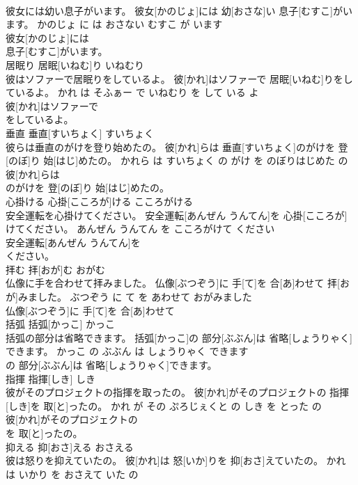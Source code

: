 \documentclass[8pt]{extreport}
\begin{document}
\begin{CJK}{UTF8}{min}
\\	彼女には幼い息子がいます。	彼女[かのじょ]には 幼[おさな]い 息子[むすこ]がいます。	かのじょ に は おさない むすこ が います	
\\	彼女[かのじょ]には
\\	息子[むすこ]がいます。			
\\	居眠り	居眠[いねむ]り	いねむり	
\\	彼はソファーで居眠りをしているよ。	彼[かれ]はソファーで 居眠[いねむ]りをしているよ。	かれ は そふぁー で いねむり を して いる よ	
\\	彼[かれ]はソファーで
\\	をしているよ。			
\\	垂直	垂直[すいちょく]	すいちょく	
\\	彼らは垂直のがけを登り始めたの。	彼[かれ]らは 垂直[すいちょく]のがけを 登[のぼ]り 始[はじ]めたの。	かれら は すいちょく の がけ を のぼりはじめた の	
\\	彼[かれ]らは
\\	のがけを 登[のぼ]り 始[はじ]めたの。			
\\	心掛ける	心掛[こころが]ける	こころがける	
\\	安全運転を心掛けてください。	安全運転[あんぜん うんてん]を 心掛[こころが]けてください。	あんぜん うんてん を こころがけて ください	
\\	安全運転[あんぜん うんてん]を
\\	ください。			
\\	拝む	拝[おが]む	おがむ	
\\	仏像に手を合わせて拝みました。	仏像[ぶつぞう]に 手[て]を 合[あ]わせて 拝[おが]みました。	ぶつぞう に て を あわせて おがみました	
\\	仏像[ぶつぞう]に 手[て]を 合[あ]わせて
\\	括弧	括弧[かっこ]	かっこ	
\\	括弧の部分は省略できます。	括弧[かっこ]の 部分[ぶぶん]は 省略[しょうりゃく]できます。	かっこ の ぶぶん は しょうりゃく できます	
\\	の 部分[ぶぶん]は 省略[しょうりゃく]できます。			
\\	指揮	指揮[しき]	しき	
\\	彼がそのプロジェクトの指揮を取ったの。	彼[かれ]がそのプロジェクトの 指揮[しき]を 取[と]ったの。	かれ が その ぷろじぇくと の しき を とった の	
\\	彼[かれ]がそのプロジェクトの
\\	を 取[と]ったの。			
\\	抑える	抑[おさ]える	おさえる	
\\	彼は怒りを抑えていたの。	彼[かれ]は 怒[いか]りを 抑[おさ]えていたの。	かれ は いかり を おさえて いた の	

\end{CJK}
\end{document}
